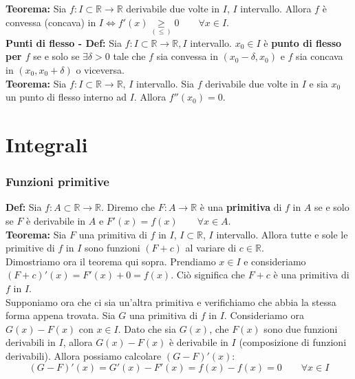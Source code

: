 \documentclass{article}
\begin{document}
\noindent\textbf{Teorema:} Sia $f: I \subset \mathbb{R} \xrightarrow{} \mathbb{R}$ derivabile due volte in $I$, $I$ intervallo. Allora $f$ è convessa (concava) in $I \iff f'(x) \underset{(\leq)}{\geq} 0 \qquad \forall x \in I$. \\

\noindent\textbf{Punti di flesso - Def:} Sia $f: I \subset \mathbb{R} \xrightarrow{} \mathbb{R}, I$ intervallo. $x_0 \in I$ è \textbf{punto di flesso per $f$} se e solo se $\exists \delta > 0$ tale che $f$ sia convessa in $(x_0 - \delta, x_0)$ e $f$ sia concava in $(x_0, x_0 + \delta)$ o viceversa.\\

\noindent\textbf{Teorema:} Sia $f: I \subset \mathbb{R} \xrightarrow{} \mathbb{R}$, $I$ intervallo. Sia $f$ derivabile due volte in $I$ e sia $x_0$ un punto di flesso interno ad $I$. Allora $f''(x_0) = 0$.

\newpage
\part{Integrali}
\section{Funzioni primitive}
\textbf{Def:} Sia $f: A \subset \mathbb{R} \xrightarrow{} \mathbb{R}$. Diremo che $F: A \xrightarrow{} \mathbb{R}$ è una \textbf{primitiva} di $f$ in $A$ se e solo se $F$ è derivabile in $A$ e $F'(x) = f(x) \qquad \forall x \in A$.\\

\noindent\textbf{Teorema:} Sia $F$ una primitiva di $f$ in $I$, $I \subset \mathbb{R}$, $I$ intervallo. Allora tutte e sole le primitive di $f$ in $I$ sono funzioni $(F + c)$ al variare di $c \in \mathbb{R}$.\\

\noindent Dimostriamo ora il teorema qui sopra. Prendiamo $x \in I$ e consideriamo $(F + c)'(x) = F'(x) + 0 = f(x)$. Ciò significa che $F + c$ è una primitiva di $f$ in $I$.\\
Supponiamo ora che ci sia un'altra primitiva e verifichiamo che abbia la stessa forma appena trovata. Sia $G$ una primitiva di $f$ in $I$. Consideriamo ora $G(x) - F(x)$ con $x \in I$. Dato che sia $G(x)$, che $F(x)$ sono due funzioni derivabili in $I$, allora $G(x) - F(x)$ è derivabile in $I$ (composizione di funzioni derivabili). Allora possiamo calcolare $(G - F)'(x)$:
\begin{equation*}
    (G - F)'(x) = G'(x) - F'(x) = f(x) - f(x) = 0 \qquad \forall x \in I
\end{equation*}
\end{document}
